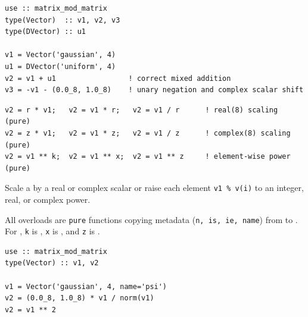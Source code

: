 \lstset{language=[95]Fortran}
\begin{lstlisting}
use :: matrix_mod_matrix
type(Vector)  :: v1, v2, v3
type(DVector) :: u1

v1 = Vector('gaussian', 4)
u1 = DVector('uniform', 4)
v2 = v1 + u1                 ! correct mixed addition
v3 = -v1 - (0.0_8, 1.0_8)    ! unary negation and complex scalar shift
\end{lstlisting}


\lstset{language=[95]Fortran}
\begin{lstlisting}
v2 = r * v1;   v2 = v1 * r;   v2 = v1 / r      ! real(8) scaling (pure)
v2 = z * v1;   v2 = v1 * z;   v2 = v1 / z      ! complex(8) scaling (pure)
v2 = v1 ** k;  v2 = v1 ** x;  v2 = v1 ** z     ! element-wise power (pure)
\end{lstlisting}

Scale a  by a real or complex scalar or raise each element \texttt{v1 \% v(i)} to an integer, real, or complex power.

All overloads are \texttt{pure} functions copying metadata (\texttt{n, is, ie, name}) from  to . For \procname{**}, \texttt{k} is , \texttt{x} is , and \texttt{z} is .

\begin{description}[leftmargin=2.2cm, style=nextline]
\end{description}

\lstset{language=[95]Fortran}
\begin{lstlisting}
use :: matrix_mod_matrix
type(Vector) :: v1, v2

v1 = Vector('gaussian', 4, name='psi')
v2 = (0.0_8, 1.0_8) * v1 / norm(v1)
v2 = v1 ** 2
\end{lstlisting}

